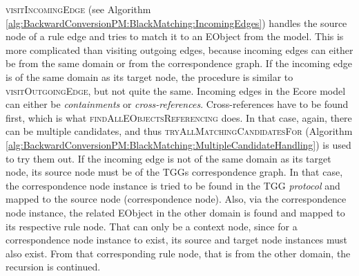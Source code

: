 \textsc{visitIncomingEdge} (see Algorithm \autoref{alg:BackwardConversionPM:BlackMatching:IncomingEdges}) handles the source node of a rule edge and tries to match it to an EObject from the model. This is more complicated than visiting outgoing edges, because incoming edges can either be from the same domain or from the correspondence graph.
If the incoming edge is of the same domain as its target node, the procedure is similar to \textsc{visitOutgoingEdge}, but not quite the same.
Incoming edges in the Ecore model can either be \emph{containments} or \emph{cross-references}. Cross-references have to be found first, which is what \textsc{findAllEObjectsReferencing} does. In that case, again, there can be multiple candidates, and thus \textsc{tryAllMatchingCandidatesFor} (Algorithm \autoref{alg:BackwardConversionPM:BlackMatching:MultipleCandidateHandling}) is used to try them out.
If the incoming edge is not of the same domain as its target node, its source node must be of the TGGs correspondence graph.
In that case, the correspondence node instance is tried to be found in the TGG \emph{protocol} and mapped to the source node (correspondence node).
Also, via the correspondence node instance, the related EObject in the other domain is found and mapped to its respective rule node.
That can only be a context node, since for a correspondence node instance to exist, its source and target node instances must also exist.
From that corresponding rule node, that is from the other domain, the recursion is continued.



